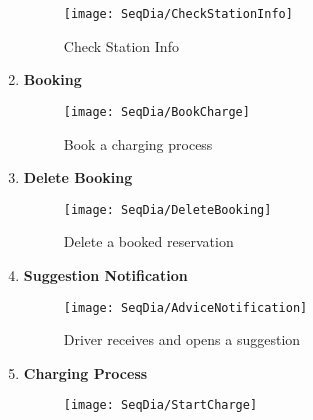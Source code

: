 \begin{enumerate}
\begin{figure}[H]
            \begin{center}
            \texttt{[image: SeqDia/CheckStationInfo]}
            \caption{Check Station Info}
            \label{fig:CheckStationInfo}
            \end{center}
        \end{figure}
        \newpage
        \item \textbf{Booking}
        \begin{figure}[H]
            \begin{center}
            \texttt{[image: SeqDia/BookCharge]}
            \caption{Book a charging process}
            \label{fig:BookCharge}
            \end{center}
        \end{figure}
        \newpage
        \item \textbf{Delete Booking}
        \begin{figure}[H]
            \begin{center}
            \texttt{[image: SeqDia/DeleteBooking]}
            \caption{Delete a booked reservation}
            \label{fig:DeleteBooking}
            \end{center}
        \end{figure}
        \item \textbf{Suggestion Notification}
        \begin{figure}[H]
            \begin{center}
            \texttt{[image: SeqDia/AdviceNotification]}
            \caption{Driver receives and opens a suggestion}
            \label{fig:AdviceNotification}
            \end{center}
        \end{figure}
        \newpage
        \item \textbf{Charging Process}
        \begin{figure}[H]
            \begin{center}
            \texttt{[image: SeqDia/StartCharge]}

\end{center}
\end{figure}
\end{enumerate}
